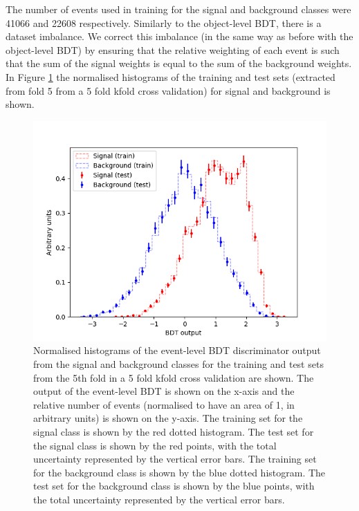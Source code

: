 The number of events used in training for the signal and background classes were 41066 and 22608 respectively. Similarly to the object-level BDT, there is a dataset imbalance. We correct this imbalance (in the same way as before with the object-level BDT) by ensuring that the relative weighting of each event is such that the sum of the signal weights is equal to the sum of the background weights.\\

In Figure \ref{fig:event-bdt-overtrain-check} the normalised histograms of the training and test sets (extracted from fold 5 from a 5 fold kfold cross validation) for signal and background is shown.
\begin{figure}[h!]
	\includegraphics[scale=0.45]{figures/overtrainingCheck_4lep_event.png}
	\centering
	\caption{Normalised histograms of the event-level BDT discriminator output from the signal and background classes for the training and test sets from the 5th fold in a 5 fold kfold cross validation are shown. The output of the event-level BDT is shown on the x-axis and the relative number of events (normalised to have an area of 1, in arbitrary units) is shown on the y-axis. The training set for the signal class is shown by the red dotted histogram. The test set for the signal class is shown by the red points, with the total uncertainty represented by the vertical error bars. The training set for the background class is shown by the blue dotted histogram. The test set for the background class is shown by the blue points, with the total uncertainty represented by the vertical error bars.}
	\label{fig:event-bdt-overtrain-check}
\end{figure}

